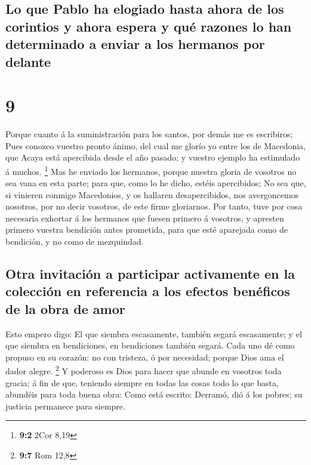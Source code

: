 \hypertarget{lo-que-pablo-ha-elogiado-hasta-ahora-de-los-corintios-y-ahora-espera-y-quuxe9-razones-lo-han-determinado-a-enviar-a-los-hermanos-por-delante}{%
\subsection{Lo que Pablo ha elogiado hasta ahora de los corintios y
ahora espera y qué razones lo han determinado a enviar a los hermanos
por
delante}\label{lo-que-pablo-ha-elogiado-hasta-ahora-de-los-corintios-y-ahora-espera-y-quuxe9-razones-lo-han-determinado-a-enviar-a-los-hermanos-por-delante}}

\hypertarget{section-8}{%
\section{9}\label{section-8}}

 Porque cuanto á la suministración para los santos, por
demás me es escribiros;  Pues conozco vuestro pronto
ánimo, del cual me glorío yo entre los de Macedonia, que Acaya está
apercibida desde el año pasado; y vuestro ejemplo ha estimulado á
muchos. \footnote{\textbf{9:2} 2Cor 8,19}  Mas he enviado
los hermanos, porque nuestra gloria de vosotros no sea vana en esta
parte; para que, como lo he dicho, estéis apercibidos;  No
sea que, si vinieren conmigo Macedonios, y os hallaren desapercibidos,
nos avergoncemos nosotros, por no decir vosotros, de este firme
gloriarnos.  Por tanto, tuve por cosa necesaria exhortar á
los hermanos que fuesen primero á vosotros, y apresten primero vuestra
bendición antes prometida, para que esté aparejada como de bendición, y
no como de mezquindad.

\hypertarget{otra-invitaciuxf3n-a-participar-activamente-en-la-colecciuxf3n-en-referencia-a-los-efectos-benuxe9ficos-de-la-obra-de-amor}{%
\subsection{Otra invitación a participar activamente en la colección en
referencia a los efectos benéficos de la obra de
amor}\label{otra-invitaciuxf3n-a-participar-activamente-en-la-colecciuxf3n-en-referencia-a-los-efectos-benuxe9ficos-de-la-obra-de-amor}}

 Esto empero digo: El que siembra escasamente, también
segará escasamente; y el que siembra en bendiciones, en bendiciones
también segará.  Cada uno dé como propuso en su corazón:
no con tristeza, ó por necesidad; porque Dios ama el dador alegre.
\footnote{\textbf{9:7} Rom 12,8}  Y poderoso es Dios para
hacer que abunde en vosotros toda gracia; á fin de que, teniendo siempre
en todas las cosas todo lo que basta, abundéis para toda buena obra:
 Como está escrito: Derramó, dió á los pobres; su justicia
permanece para siempre.


